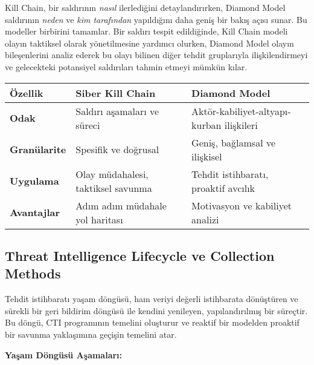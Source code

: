 Kill Chain, bir saldırının \textit{nasıl} ilerlediğini detaylandırırken, Diamond Model saldırının \textit{neden} ve \textit{kim tarafından} yapıldığını daha geniş bir bakış açısı sunar. Bu modeller birbirini tamamlar. Bir saldırı tespit edildiğinde, Kill Chain modeli olayın taktiksel olarak yönetilmesine yardımcı olurken, Diamond Model olayın bileşenlerini analiz ederek bu olayı bilinen diğer tehdit gruplarıyla ilişkilendirmeyi ve gelecekteki potansiyel saldırıları tahmin etmeyi mümkün kılar.

\begin{longtable}{|p{3cm}|p{5.5cm}|p{5.5cm}|}
\hline
\textbf{Özellik} & \textbf{Siber Kill Chain} & \textbf{Diamond Model} \\
\hline
\textbf{Odak} & Saldırı aşamaları ve süreci & Aktör-kabiliyet-altyapı-kurban ilişkileri \\
\hline
\textbf{Granülarite} & Spesifik ve doğrusal & Geniş, bağlamsal ve ilişkisel \\
\hline
\textbf{Uygulama} & Olay müdahalesi, taktiksel savunma & Tehdit istihbaratı, proaktif avcılık \\
\hline
\textbf{Avantajlar} & Adım adım müdahale yol haritası & Motivasyon ve kabiliyet analizi \\
\hline
\end{longtable}

\subsection{Threat Intelligence Lifecycle ve Collection Methods}

Tehdit istihbaratı yaşam döngüsü, ham veriyi değerli istihbarata dönüştüren ve sürekli bir geri bildirim döngüsü ile kendini yenileyen, yapılandırılmış bir süreçtir. Bu döngü, CTI programının temelini oluşturur ve reaktif bir modelden proaktif bir savunma yaklaşımına geçişin temelini atar.

\textbf{Yaşam Döngüsü Aşamaları:}

